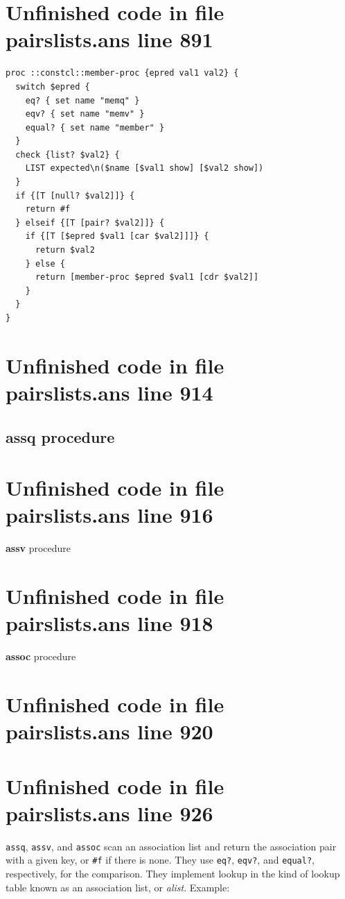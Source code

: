 \documentclass[twoside,9pt]{report}
\begin{document}
\section{Unfinished code in file pairslists.ans line 891}
\begin{lstlisting}
proc ::constcl::member-proc {epred val1 val2} {
  switch $epred {
    eq? { set name "memq" }
    eqv? { set name "memv" }
    equal? { set name "member" }
  }
  check {list? $val2} {
    LIST expected\n($name [$val1 show] [$val2 show])
  }
  if {[T [null? $val2]]} {
    return #f
  } elseif {[T [pair? $val2]]} {
    if {[T [$epred $val1 [car $val2]]]} {
      return $val2
    } else {
      return [member-proc $epred $val1 [cdr $val2]]
    }
  }
}
\end{lstlisting}
\section{Unfinished code in file pairslists.ans line 914}
\subsection{assq procedure}
\label{assq-procedure}
\section{Unfinished code in file pairslists.ans line 916}

\noindent \textbf{assv} procedure

\section{Unfinished code in file pairslists.ans line 918}

\noindent \textbf{assoc} procedure

\section{Unfinished code in file pairslists.ans line 920}

\section{Unfinished code in file pairslists.ans line 926}

\texttt{assq}, \texttt{assv}, and \texttt{assoc} scan an association list and return the association pair with a given key, or \texttt{\#f} if there is none. They use \texttt{eq?}, \texttt{eqv?}, and \texttt{equal?}, respectively, for the comparison. They implement lookup in the kind of lookup table known as an association list, or \emph{alist}. Example:
\end{document}
